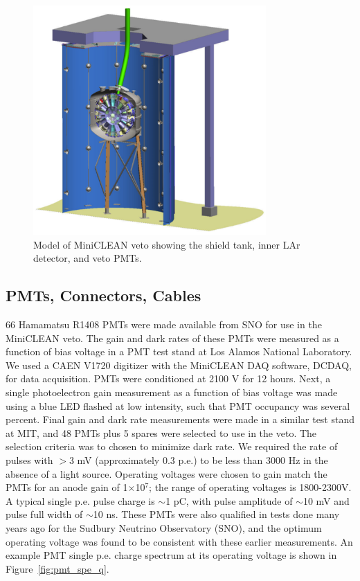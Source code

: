 \documentclass{JINST}
\begin{document}
\begin{figure}[ht]
\begin{center}
\includegraphics[width=3.5in]{graphics/miniclean_overview_drawing.pdf}
\caption{Model of MiniCLEAN veto showing the shield tank, inner LAr detector, and veto PMTs.
\label{fig:veto_geom}}
\end{center}
\end{figure}

\subsection{PMTs, Connectors, Cables}
\label{sec:pmts}
%
66 Hamamatsu R1408 PMTs were made available from SNO for use in the MiniCLEAN
veto. The gain and dark rates of these PMTs were measured as a
function of bias voltage in a PMT test stand at Los Alamos National
Laboratory.  We used a CAEN V1720 digitizer with the MiniCLEAN DAQ
software, DCDAQ, for data acquisition. PMTs were conditioned at 2100 V
for 12 hours. Next, a single photoelectron gain measurement as a
function of bias voltage was made using a blue LED flashed at low
intensity, such that PMT occupancy was several percent. Final gain and
dark rate measurements were made in a similar test stand at MIT, and
48 PMTs plus 5 spares were selected to use in the veto.  The selection
criteria was to chosen to minimize dark rate.  We required the rate of pulses with
$>$3 mV (approximately 0.3 p.e.) to be less than 3000 Hz in the
absence of a light source.  Operating voltages were chosen to gain
match the PMTs for an anode gain of 1$\times$10$^7$; the range of
operating voltages is 1800-2300V.  A typical single p.e. pulse charge
is $\sim$1 pC, with pulse amplitude of $\sim$10 mV and pulse full width of
$\sim$10 ns.  These PMTs were also qualified in tests done many years ago for
the Sudbury Neutrino Observatory (SNO), and the optimum operating voltage was
found to be consistent with these earlier measurements.
An example PMT single p.e. charge spectrum at its operating voltage is
shown in Figure~\ref{fig:pmt_spe_q}.
\end{document}
